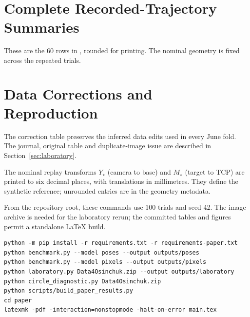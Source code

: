 \documentclass[12pt,a4paper]{article}
\newcommand{\code}[1]{\texttt{\detokenize{#1}}}
\begin{document}
\clearpage
\section{Complete Recorded-Trajectory Summaries}\label{app:replay}
These are the 60 rows in \code{results/thesis/summary.csv}, rounded for printing. The nominal geometry is fixed across the repeated trials. \cite{experimentcode}


\clearpage
\section{Data Corrections and Reproduction}\label{app:reproduction}

The correction table preserves the inferred data edits used in every June fold. The journal, original table and duplicate-image issue are described in Section~\ref{sec:laboratory}. \cite{laboratoryarchive,experimentcode}

The nominal replay transforms $Y_\star$ (camera to base) and $M_\star$ (target to TCP) are printed to six decimal places, with translations in millimetres. They define the synthetic reference; unrounded entries are in the geometry metadata. \cite{experimentcode}


From the repository root, these commands use 100 trials and seed 42. The image archive is needed for the laboratory rerun; the committed tables and figures permit a standalone LaTeX build. \cite{experimentcode}
\begingroup\footnotesize
\begin{verbatim}
python -m pip install -r requirements.txt -r requirements-paper.txt
python benchmark.py --model poses --output outputs/poses
python benchmark.py --model pixels --output outputs/pixels
python laboratory.py Data4Osinchuk.zip --output outputs/laboratory
python circle_diagnostic.py Data4Osinchuk.zip
python scripts/build_paper_results.py
cd paper
latexmk -pdf -interaction=nonstopmode -halt-on-error main.tex
\end{verbatim}
\endgroup

\clearpage
{}
{}


\end{document}

